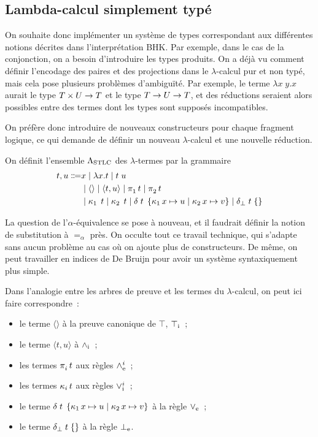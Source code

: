 \subsection{Lambda-calcul simplement typé}

On souhaite donc implémenter un système de types correspondant aux différentes
notions décrites dans l'interprétation BHK. Par exemple, dans le cas de la
conjonction, on a besoin d'introduire les types produits. On a déjà vu comment
définir l'encodage des paires et des projections dans le $\lambda$-calcul
pur et non typé, mais cela pose plusieurs problèmes d'ambiguïté. Par exemple,
le terme $\lambda x\;y.x$ aurait le type $T\times U \to T$
et le type $T \to U \to T$, et des réductions seraient
alors possibles entre des termes dont les types sont supposés incompatibles.

On préfère donc introduire de nouveaux constructeurs pour chaque fragment
logique, ce qui demande de définir un nouveau $\lambda$-calcul et une
nouvelle réduction.

\begin{definition}
  On définit l'ensemble $\Lambda_{\mathrm{STLC}}$ des $\lambda$-termes par la grammaire
  \begin{align*}
    t,u \inddefeq & x \mid \lambda x.t\mid t\;u \\
    &\mid \langle\rangle \mid
    \langle t,u \rangle \mid \projP{1}{} t\mid\projP{2}{} t\\
    &\mid \coprojP{1}\;t\mid\coprojP{2}\;t\mid \deltaSTLC t x u x v\mid
    \dBSTLC{t}
  \end{align*}
\end{definition}

\begin{remark}
  La question de l'$\alpha$-équivalence se pose à nouveau, et il faudrait
  définir la notion de substitution à $=_\alpha$ près. On occulte tout ce
  travail technique, qui s'adapte sans aucun problème au cas où on ajoute plus
  de constructeurs. De même, on peut travailler en indices de De Bruijn pour
  avoir un système syntaxiquement plus simple.
\end{remark}

Dans l'analogie entre les arbres de preuve et les termes du $\lambda$-calcul,
on peut ici faire correspondre~:
\begin{itemize}
\item le terme $\langle\rangle$ à la preuve canonique de $\top$,
  $\top_{\mathrm{i}}$~;
\item le terme $\langle t,u\rangle$ à $\mathord{\land}_{\mathrm{i}}$~;
\item les termes $\mathop{\pi_{i}^{}}t$ aux règles $\mathord{\land}_{\mathrm{e}}^{i}$~;
\item les termes $\mathop{\kappa_{i}} t$ aux règles $\mathord{\lor}_{\mathrm{i}}^{i}$~;
\item le terme $\delta\;t\;\left\{\mathop{\kappa_{1}} x\mapsto u \;\middle\vert\; \mathop{\kappa_{2}} x\mapsto v\right\}$ à
  la règle $\mathord{\lor}_{\mathrm{e}}$~;
\item le terme $\delta_{\bot}\;t\;\{\}$ à la règle $\bot_{\mathrm{e}}$.
\end{itemize}

